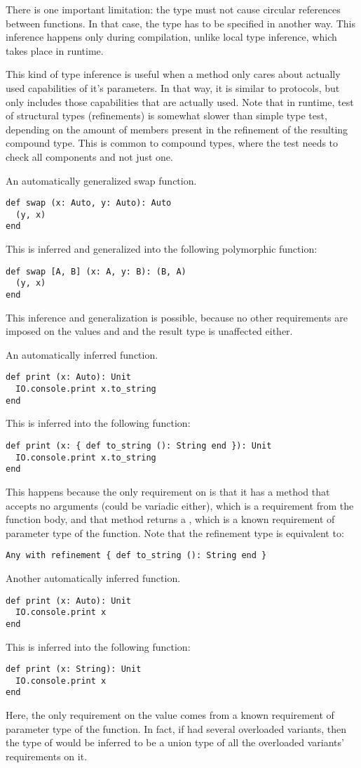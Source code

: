 There is one important limitation: the  type must not cause circular references between functions. In that case, the type has to be specified in another way. This inference happens only during compilation, unlike local type inference, which takes place in runtime. 

This kind of type inference is useful when a method only cares about actually used capabilities of it's parameters. In that way, it is similar to protocols, but only includes those capabilities that are actually used. Note that in runtime, test of structural types (refinements) is somewhat slower than simple type test, depending on the amount of members present in the refinement of the resulting compound type. This is common to compound types, where the test needs to check all components and not just one. 

\example An automatically generalized swap function.
\begin{lstlisting}
def swap (x: Auto, y: Auto): Auto
  (y, x)
end
\end{lstlisting}
This is inferred and generalized into the following polymorphic function:
\begin{lstlisting}
def swap [A, B] (x: A, y: B): (B, A)
  (y, x)
end
\end{lstlisting}
This inference and generalization is possible, because no other requirements are imposed on the values  and  and the result type is unaffected either. 

\example An automatically inferred function.
\begin{lstlisting}
def print (x: Auto): Unit
  IO.console.print x.to_string
end
\end{lstlisting}
This is inferred into the following function:
\begin{lstlisting}
def print (x: { def to_string (): String end }): Unit
  IO.console.print x.to_string
end
\end{lstlisting}
This happens because the only requirement on  is that it has a method  that accepts no arguments (could be variadic either), which is a requirement from the function body, and that method returns a , which is a known requirement of parameter type of the  function. Note that the refinement type is equivalent to:
\begin{lstlisting}
Any with refinement { def to_string (): String end }
\end{lstlisting}

\example Another automatically inferred function.
\begin{lstlisting}
def print (x: Auto): Unit
  IO.console.print x
end
\end{lstlisting}
This is inferred into the following function:
\begin{lstlisting}
def print (x: String): Unit
  IO.console.print x
end
\end{lstlisting}
Here, the only requirement on the value  comes from a known requirement of parameter type of the  function. In fact, if  had several overloaded variants, then the type of  would be inferred to be a union type of all the overloaded variants' requirements on it. 

